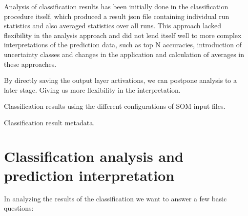 \documentclass[11pt,a4paper]{article}
\begin{document}
Analysis of classification results has been initially done in the classification procedure itself, which produced a result json file containing individual run statistics and also averaged statistics over all runs.
This approach lacked flexibility in the analysis approach and did not lend itself well to more complex interpretations of the prediction data, such as top N accuracies, introduction of uncertainty classes and changes in the application and calculation of averages in these approaches.

By directly saving the output layer activations, we can postpone analysis to a later stage. Giving us more flexibility in the interpretation.

\begin{table}[h]
   \centering
   
   \caption{Classification results using the different configurations of SOM input files.}
\end{table}

\begin{landscape}
\begin{table}
   \resizebox{\linewidth}{!}{%
   
   }
   \caption{Classification result metadata.}
\end{table}
\end{landscape}

\section{Classification analysis and prediction interpretation}

In analyzing the results of the classification we want to answer a few basic questions:
\end{document}
